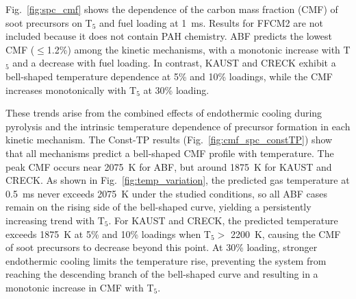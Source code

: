 Fig.~\ref{fig:spc_cmf} shows the dependence of the carbon mass fraction (CMF) of soot precursors on T$_5$ and fuel loading at 1~ms. Results for FFCM2 are not included because it does not contain PAH chemistry. ABF predicts the lowest CMF ($\le$1.2\%) among the kinetic mechanisms, with a monotonic increase with T$_5$ and a decrease with fuel loading. In contrast, KAUST and CRECK exhibit a bell-shaped temperature dependence at 5\% and 10\% loadings, while the CMF increases monotonically with T$_5$ at 30\% loading. 


These trends arise from the combined effects of endothermic cooling during pyrolysis and the intrinsic temperature dependence of precursor formation in each kinetic mechanism. The Const-TP results (Fig.~\ref{fig:cmf_spc_constTP}) show that all mechanisms predict a bell-shaped CMF profile with temperature. The peak CMF occurs near 2075~K for ABF, but around 1875~K for KAUST and CRECK. As shown in Fig.~\ref{fig:temp_variation}, the predicted gas temperature at 0.5~ms never exceeds 2075~K under the studied conditions, so all ABF cases remain on the rising side of the bell-shaped curve, yielding a persistently increasing trend with T$_5$. For KAUST and CRECK, the predicted temperature exceeds 1875~K at 5\% and 10\% loadings when T$_5$$>$ 2200~K, causing the CMF of soot precursors to decrease beyond this point. At 30\% loading, stronger endothermic cooling limits the temperature rise, preventing the system from reaching the descending branch of the bell-shaped curve and resulting in a monotonic increase in CMF with T$_5$.


